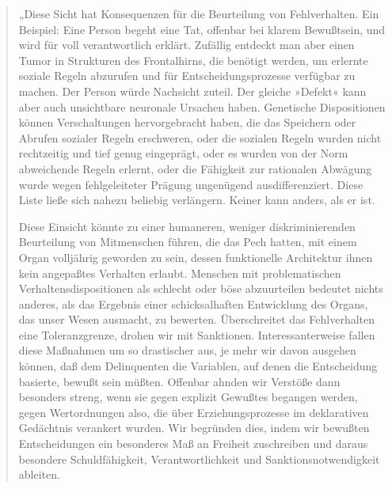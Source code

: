 \documentclass[
  a4paper,
]{report}
\begin{document}
\begin{quote}
„Diese Sicht hat Konsequenzen für die Beurteilung von Fehlverhalten. Ein Beispiel: Eine Person begeht eine Tat, offenbar bei klarem Bewußtsein, und wird für voll verantwortlich erklärt. Zufällig entdeckt man aber einen Tumor in Strukturen des Frontalhirns, die benötigt werden, um erlernte soziale Regeln abzurufen und für Entscheidungsprozesse verfügbar zu machen. Der Person würde Nachsicht zuteil. Der gleiche »Defekt« kann aber auch unsichtbare neuronale Ursachen haben. Genetische Dispositionen können Verschaltungen hervorgebracht haben, die das Speichern oder Abrufen sozialer Regeln erschweren, oder die sozialen Regeln wurden nicht rechtzeitig und tief genug eingeprägt, oder es wurden von der Norm abweichende Regeln erlernt, oder die Fähigkeit zur rationalen Abwägung wurde wegen fehlgeleiteter Prägung ungenügend ausdifferenziert. Diese Liste ließe sich nahezu beliebig verlängern. Keiner kann anders, als er ist.

Diese Einsicht könnte zu einer humaneren, weniger diskriminierenden Beurteilung von Mitmenschen führen, die das Pech hatten, mit einem Organ volljährig geworden zu sein, dessen funktionelle Architektur ihnen kein angepaßtes Verhalten erlaubt. Menschen mit problematischen Verhaltensdispositionen als schlecht oder böse abzuurteilen bedeutet nichts anderes, als das Ergebnis einer schicksalhaften Entwicklung des Organs, das unser Wesen ausmacht, zu bewerten. Überschreitet das Fehlverhalten eine Toleranzgrenze, drohen wir mit Sanktionen. Interessanterweise fallen diese Maßnahmen um so drastischer aus, je mehr wir davon ausgehen können, daß dem Delinquenten die Variablen, auf denen die Entscheidung basierte, bewußt sein müßten. Offenbar ahnden wir Verstöße dann besonders streng, wenn sie gegen explizit Gewußtes begangen werden, gegen Wertordnungen also, die über Erziehungsprozesse im deklarativen Gedächtnis verankert wurden. Wir begründen dies, indem wir bewußten Entscheidungen ein besonderes Maß an Freiheit zuschreiben und daraus besondere Schuldfähigkeit, Verantwortlichkeit und Sanktionsnotwendigkeit ableiten.


\end{quote}
\end{document}
